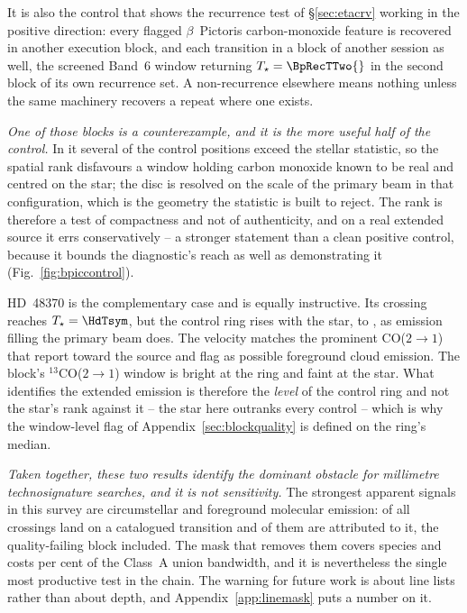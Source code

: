 It is also the control that shows the recurrence test of
\S\ref{sec:etacrv} working in the positive direction: every flagged
$\beta$~Pictoris carbon-monoxide feature is recovered in another execution
block, and each transition in a block of another session as well, the
screened Band~6 window returning
$T_\star=\BpRecTTwo{}$ in the second block of its own recurrence set. A
non-recurrence elsewhere means nothing unless the same machinery recovers a
repeat where one exists.

\emph{One of those blocks is a counterexample, and it is the more useful half
of the control.} In it several of the \NCtrl{} control positions exceed the
stellar statistic, so the spatial rank disfavours a window holding carbon
monoxide known to be real and centred on the star; the disc is resolved on
the scale of the primary beam in that configuration, which is the geometry
the statistic is built to reject. The rank is therefore a test of
compactness and not of authenticity, and on a real extended source it errs
conservatively -- a stronger statement than a clean positive control, because
it bounds the diagnostic's reach as well as demonstrating it
(Fig.~\ref{fig:bpiccontrol}).



HD~48370 is the complementary case and is equally instructive. Its crossing
reaches $T_\star=\HdTsym$, but the control ring rises with the star, to
\HdRingMax, as emission filling the primary beam does. The velocity matches
the prominent CO($2{\to}1$) that \citet{Cataldi2023} report toward the
source and flag as possible foreground cloud emission. The block's
$^{13}$CO($2{\to}1$) window is bright at the ring and faint at the star.
What identifies the extended emission is therefore the \emph{level} of the
control ring and not the star's rank against it -- the star here outranks
every control -- which is why the window-level flag of
Appendix~\ref{sec:blockquality} is defined on the ring's median.

\emph{Taken together, these two results identify the dominant obstacle for
millimetre technosignature searches, and it is not sensitivity.} The
strongest apparent signals in this survey are circumstellar and
foreground molecular emission: \MkNCoinc{} of all \NCross{} crossings land
on a catalogued transition and \NAttributed{} of them are attributed to it,
the quality-failing block included. The mask that
removes them covers \FrNSpec{} species and costs \MkMaskAPct{} per cent of
the Class~A union bandwidth, and it is nevertheless the single most
productive test in the chain. The warning for
future work is about line lists rather than about depth, and
Appendix~\ref{app:linemask} puts a number on it.

